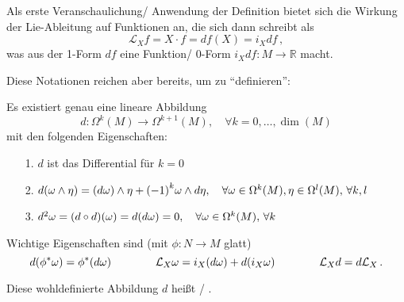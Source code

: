 \documentclass[../H_Analysis_main.tex]{subfiles}
\begin{document}
\begin{bsp}
Als erste Veranschaulichung/ Anwendung der Definition bietet sich die Wirkung der Lie-Ableitung auf Funktionen an, die sich dann schreibt als
\begin{equation*}
\mathcal{L}_X f = X \cdot f = df(X) = i_X df \, ,
\end{equation*}
was aus der 1-Form $df$ eine Funktion/ 0-Form $i_X df: M \rightarrow \mathbb{R}$ macht.
\end{bsp}

Diese Notationen reichen aber bereits, um zu \enquote{definieren}:
\begin{satz}\label{satz:aussereabl}
Es existiert genau eine lineare Abbildung
\begin{equation*}
d: \Omega^k(M) \rightarrow \Omega^{k + 1}(M), \quad \forall k = 0, \dots, \dim(M)
\end{equation*}
mit den folgenden Eigenschaften:
\begin{itemize}
\item[1.] $d$ ist das Differential für $k = 0$

\item[2.] $d\qty(\omega \wedge \eta) = \qty(d\omega) \wedge \eta + \qty(-1)^k \omega \wedge d\eta, \quad \forall \omega \in \Omega^k(M), \eta \in \Omega^l(M), \, \forall k, l$

\item[3.] $d^2 \omega = \qty(d \circ d)(\omega) = d\qty(d\omega) = 0, \quad \forall \omega \in \Omega^k(M), \, \forall k$
\end{itemize}

Wichtige Eigenschaften sind (mit $\phi: N \rightarrow M$ glatt)
\begin{equation}\label{eq:aeusseigensch}
d \qty(\phi^* \omega) = \phi^* \qty(d\omega) \qquad \qquad \mathcal{L}_X \omega = i_X \qty(d\omega) + d \qty(i_X \omega) \qquad \qquad \mathcal{L}_X d = d \mathcal{L}_X \, .
\end{equation}
\end{satz}
\begin{defi}
Diese wohldefinierte Abbildung $d$ heißt / .
\end{defi}
\end{document}
